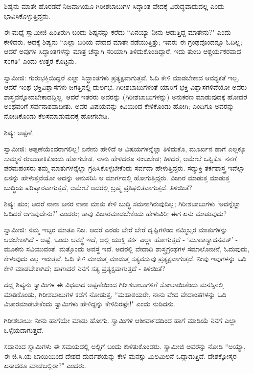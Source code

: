 ಶಿಷ್ಯನು ಮಾತೇ ಹೊರಡದೆ ನಿಜವಾಗಿಯೂ ಗಿರೀಶಬಾಬುಗಳ ಸಿದ್ಧಾಂತ ವೇದಕ್ಕೆ ವಿರುದ್ಧವಾದುದಲ್ಲ ಎಂದು ಭಾವಿಸಿಕೊಳ್ಳುತ್ತಿದ್ದನು.

ಈ ಮಧ್ಯೆ ಸ್ವಾಮೀಜಿ ಹಿಂತಿರುಗಿ ಬಂದು ಶಿಷ್ಯನನ್ನು ಕರೆದು “ಏನಯ್ಯಾ ನೀನು ಆಡುತ್ತಿದ್ದ ಮಾತೇನು?" ಎಂದು ಕೇಳಿದರು. ಅದಕ್ಕೆ ಶಿಷ್ಯನು “ಎಲ್ಲಾ ಬರಿಯ ವೇದದ ಮಾತೇ ನಡೆಯುತ್ತಿತ್ತು; ಇವರು ಈ ಗ್ರಂಥವೊಂದನ್ನೂ ಓದಿಲ್ಲ; ಆದರೆ ಅವುಗಳ ಸಿದ್ಧಾಂತಗಳನ್ನು ಮಾತ್ರ ಚೆನ್ನಾಗಿ ಸರಿಯಾಗಿ ತಿಳಿದುಕೊಂಡಿದ್ದಾರೆ. ಇದು ತುಂಬ ಆಶ್ಚರ್ಯಕರವಾದ ಸಂಗತಿ" ಎಂದು ಉತ್ತರ ಕೊಟ್ಟನು.

ಸ್ವಾಮೀಜಿ: ಗುರುಭಕ್ತಿಯಿದ್ದರೆ ಎಲ್ಲಾ ಸಿದ್ಧಾಂತಗಳು ಪ್ರತ್ಯಕ್ಷವಾಗುತ್ತವೆ. ಓದಿ ಕೇಳಿ ಮಾಡಬೇಕಾದ ಆವಶ್ಯಕತೆ ಇಲ್ಲ. ಆದರೆ ಇಂಥ ಭಕ್ತಿವಿಶ್ವಾಸಗಳು ಜಗತ್ತಿನಲ್ಲಿ ದುರ್ಲಭ. ಗಿರೀಶಬಾಬುಗಳಂತೆ ಯಾರಿಗೆ ಭಕ್ತಿ ವಿಶ್ವಾಸಗಳಿವೆಯೋ ಅವರು ಶಾಸ್ತ್ರವನ್ನೋದಬೇಕಾದದ್ದಿಲ್ಲ. ಆದರೆ ಇತರರು ಅವರನ್ನು (ಗಿರೀಶಬಾಬುಗಳನ್ನು) ಅನುಕರಣ ಮಾಡುವುದಕ್ಕೆ ಹೋದರೆ ಅಂಥವರಿಗೆ ಸರ್ವನಾಶವಾದೀತು. ಅವರ ವಿಷಯವನ್ನು ಕಿವಿಯಿಂದ ಕೇಳಿಕೊಂಡು ಹೋಗಿ; ಎಂದಿಗೂ ಅವರನ್ನು ನೋಡಿಕೊಂಡು ಕೆಲಸಮಾಡುವುದಕ್ಕೆ ಹೋಗಬೇಡಿ.

ಶಿಷ್ಯ: ಅಪ್ಪಣೆ.

ಸ್ವಾಮೀಜಿ: ಅಪ್ಪಣೆಯೆಂದರಾಗಲಿಲ್ಲ! ಏನೇನು ಹೇಳಿದೆ ಆ ವಿಷಯಗಳನ್ನೆಲ್ಲಾ ತಿಳಿದುಕೊ, ಮೂರ್ಖನ ಹಾಗೆ ಎಲ್ಲಕ್ಕೂ ಸುಮ್ಮನೆ ರುಜುಹಾಕಿಕೊಂಡು ಹೋಗಬೇಡ. ನಾನು ಹೇಳಿದರೂ ನಂಬಬೇಡ; ತಿಳಿದರೆ, ಆಮೇಲೆ ಒಪ್ಪಿಕೊ. ನನಗೆ ಪರಮಹಂಸರು ತಮ್ಮ ಮಾತುಗಳನ್ನೆಲ್ಲಾ ಗ್ರಹಿಸಿಕೊಳ್ಳಬೇಕೆಂದು ಸರ್ವದಾ ಹೇಳುತ್ತಿದ್ದರು. ಸದ್ಯುಕ್ತಿ ತರ್ಕಶಾಸ್ತ್ರ ಇವೆಲ್ಲಾ ಏನನ್ನು ಹೇಳುತ್ತವೆಯೋ ಅದನ್ನು ಅನುಸರಿಸಿ ಆ ಮಾರ್ಗದಲ್ಲಿ ಹೋಗುತ್ತಿದ್ದರು. ವಿಚಾರ ಮಾಡುತ್ತ ಮಾಡುತ್ತ ಬುದ್ಧಿಯ ಪರಿಷ್ಕಾರವಾಗುತ್ತದೆ, ಆಮೇಲೆ ಅದರಲ್ಲಿ ಬ್ರಹ್ಮ ಪ್ರತಿಫಲಿತವಾಗುತ್ತದೆ. ತಿಳಿಯಿತೆ?

ಶಿಷ್ಯ: ಹುಂ; ಆದರೆ ನಾನಾ ಜನರ ನಾನಾ ಮಾತು ಕೇಳಿ ಬುದ್ಧಿ ಸಮನಾಗಿರುವುದಿಲ್ಲ; ಗಿರೀಶಬಾಬುಗಳು ‘ಅದನ್ನೆಲ್ಲಾ ಓದಿದರೆ ಆಗುವುದೇನು?’ ಎಂದರು; ತಾವು ವಿಚಾರಮಾಡಬೇಕೆಂದು ಹೇಳುವಿರಿ; ಈಗ ಏನು ಮಾಡುವುದು?

ಸ್ವಾಮೀಜಿ: ನಮ್ಮ ಇಬ್ಬರ ಮಾತೂ ನಿಜ. ಆದರೆ ಎರಡು ಬೇರೆ ಬೇರೆ ದೃಷ್ಟಿಗಳಿಂದ ನಮ್ಮಿಬ್ಬರ ಮಾತುಗಳನ್ನು ಆಡಬೇಕಾಗಿದೆ - ಅಷ್ಟೆ. ಒಂದು ಅವಸ್ಥೆ ಇದೆ, ಅಲ್ಲಿ ಯುಕ್ತಿ ತರ್ಕ ಎಲ್ಲಾ ಹೋಗುತ್ತದೆ - ‘ಮೂಕಾಸ್ವಾದನವತ್’ - ಮೂಕನು ಸವಿಯುವಂತೆ. ಮತ್ತೊಂದು ಅವಸ್ಥೆ ಇದೆ. ಅದರಲ್ಲಿ ವೇದಾದಿ ಶಾಸ್ತ್ರಗ್ರಂಥಗಳ ಸಮಾಲೋಚನೆ, ಓದುವುದು, ಕೇಳುವುದು ಎಲ್ಲ ಇರುತ್ತವೆ. ಓದಿ ಕೇಳಿ ಮಾಡುತ್ತ ಮಾಡುತ್ತ ಸತ್ಯವಸ್ತುವು ಪ್ರತ್ಯಕ್ಷವಾಗುತ್ತದೆ. ನೀವು ಇವುಗಳನ್ನು ಓದಿ ಕೇಳಿ ಮಾಡಬೇಕಾಗಿದೆ; ಹಾಗಾದರೆ ನಿನಗೆ ಸತ್ಯ ಪ್ರತ್ಯಕ್ಷವಾಗುತ್ತದೆ - ತಿಳಿಯಿತೆ?

ದಡ್ಡ ಶಿಷ್ಯನು ಸ್ವಾಮಿಗಳ ಈ ವಿಧವಾದ ಅಪ್ಪಣೆಯಿಂದ ಗಿರೀಶಬಾಬುಗಳಿಗೆ ಸೋಲಾಯಿತೆಂದು ಮನಸ್ಸಿನಲ್ಲಿ ಮಾಡಿಕೊಂಡು, ಗಿರೀಶಬಾಬುಗಳ ಕಡೆಗೆ ನೋಡುತ್ತ, “ಮಹಾಶಯರೇ, ನಾನು ವೇದ ವೇದಾಂತಗಳನ್ನು ಓದಿ ವಿಚಾರಮಾಡಬೇಕೆಂದು ಸ್ವಾಮಿಗಳು ಹೇಳಿದ್ದನ್ನು ಕೇಳಿದಿರಷ್ಟೇ!" ಎಂದು ನುಡಿದನು.

ಗಿರೀಶಬಾಬು: ನೀನು ಹಾಗೆಯೇ ಮಾಡು ಹೋಗು. ಸ್ವಾಮಿಗಳ ಆಶೀರ್ವಾದದಿಂದ ಹಾಗೆ ಮಾಡಿಯೆ ನಿನಗೆ ಎಲ್ಲಾ ಒಳ್ಳೆಯದಾಗುತ್ತದೆ.

ಸದಾನಂದ ಸ್ವಾಮಿಗಳು ಈ ಸಮಯದಲ್ಲಿ ಅಲ್ಲಿಗೆ ಬಂದು ಕುಳಿತುಕೊಂಡರು. ಸ್ವಾಮೀಜಿ ಅವರನ್ನು ನೋಡಿ “ಅಯ್ಯಾ, ಈ ಜಿ.ಸಿ.ಯ ಬಾಯಿಯಿಂದ ದೇಶದ ದುರ್ದಶೆಯನ್ನು ಕೇಳಿ ಮನಸ್ಸು ಮಿಲಮಿಲನೆ ಒದ್ದಾಡುತ್ತಿದೆ. ದೇಶಕ್ಕೋಸ್ಕರ ಏನಾದರೂ ಮಾಡಬಲ್ಲಿರಾ?" ಎಂದರು.


